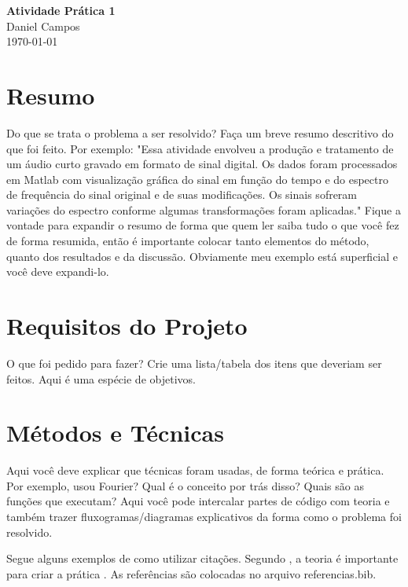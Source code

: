 \documentclass[12pt,a4paper, brazil]{article}
\begin{document}
\begin{center}
{\textbf {\huge Atividade Prática 1}}\\[5mm]
{\large Daniel Campos} \\[5mm]
\today\\[5mm] %
\end{center}


\section{Resumo}

Do que se trata o problema a ser resolvido? Faça um breve resumo descritivo do que foi feito. Por exemplo: "Essa atividade envolveu a produção e tratamento de um áudio curto gravado em formato de sinal digital. Os dados foram processados em Matlab com visualização gráfica do sinal em função do tempo e do espectro de frequência do sinal original e de suas modificações. Os sinais sofreram variações do espectro conforme algumas transformações foram aplicadas."  Fique a vontade para expandir o resumo de forma que quem ler saiba tudo o que você fez de forma resumida, então é importante colocar tanto elementos do método, quanto dos resultados e da discussão. Obviamente meu exemplo está superficial e você deve expandi-lo. 

\section{Requisitos do Projeto}

O que foi pedido para fazer? Crie uma lista/tabela dos itens que deveriam ser feitos. Aqui é uma espécie de objetivos.

\section{Métodos e Técnicas}

Aqui você deve explicar que técnicas foram usadas, de forma teórica e prática. Por exemplo, usou Fourier? Qual é o conceito por trás disso? Quais são as funções que executam? Aqui você pode intercalar partes de código com teoria e também trazer fluxogramas/diagramas explicativos da forma como o problema foi resolvido. 

Segue alguns exemplos de como utilizar citações. Segundo \textcite{citacao-exemplo}, a teoria é importante para criar a prática \cite{citacao-exemplo}. As referências são colocadas no arquivo referencias.bib. 
\end{document}
